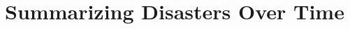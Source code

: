 \documentclass{sig-alternate} \usepackage{url} \usepackage{color}
\begin{document}
%

\title{Summarizing Disasters Over Time}
%
%
%
%
%
\end{document}
